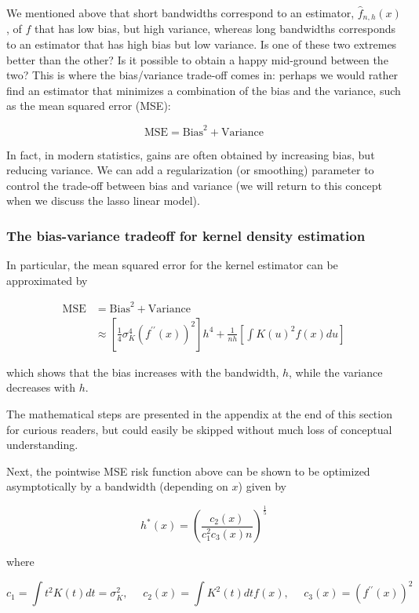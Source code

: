 We mentioned above that short bandwidths correspond to an estimator, $\hat{f}_{n, h}(x)$, of $f$ that has low bias, but high variance, whereas long bandwidths corresponds to an estimator that has high bias but low variance. Is one of these two extremes better than the other? Is it possible to obtain a happy mid-ground between the two? This is where the bias/variance trade-off comes in: perhaps we would rather find an estimator that minimizes a combination of the bias and the variance, such as the mean squared error (MSE):

$$\text{MSE} = \text{Bias}^2 + \text{Variance}$$

In fact, in modern statistics, gains are often obtained by increasing bias, but reducing variance. We can add a regularization (or smoothing) parameter to control the trade-off between bias and variance (we will return to this concept when we discuss the lasso linear model).





\subsubsection*{The bias-variance tradeoff for kernel density estimation}



In particular, the mean squared error for the kernel estimator can be approximated by


\begin{align*}
\text{MSE} &= \text{Bias}^2 + \text{Variance} \\
& \approx \left[ \frac{1}{4} \sigma^4_K \left(f^{\prime \prime}(x)\right)^2\right] h^4 + \frac{1}{nh} \left[ \int K(u)^2 f(x) du \right]
\end{align*}


which shows that the bias increases with the bandwidth, $h$, while the variance decreases with $h$. 

The mathematical steps are presented in the appendix at the end of this section for curious readers, but could easily be skipped without much loss of conceptual understanding.


Next, the pointwise MSE risk function above can be shown to be optimized asymptotically by a bandwidth (depending on $x$) given by

$$h^*(x) = \left( \frac{c_2(x)}{c_1^2c_3(x) n} \right)^{\frac15}$$

where

$$c_1 = \int t^2 K(t) dt = \sigma^2_K, ~~~~~~ c_2(x) = \int K^2(t) dt f(x), ~~~~~~ c_3(x) = \left(f^{\prime \prime}(x) \right)^2$$

